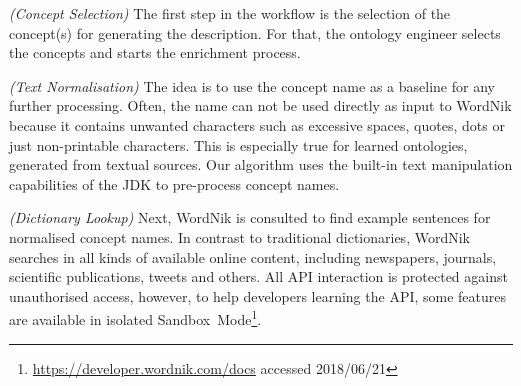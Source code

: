 \begin{enumerate}[label=\textbf{[Step \Roman*]},leftmargin=\widthof{[Step III]}+\labelsep]
	\item \emph{(Concept Selection)} The first step in the workflow is the selection of the concept(s)
	      for generating the description. For that, the ontology engineer selects the concepts and
		  starts the enrichment process. 
	\item \emph{(Text Normalisation)} The idea is to use the concept name as a baseline for any further
	      processing. Often, the name can not be used directly as input to WordNik because it
		  contains unwanted characters such as excessive spaces, quotes, dots or just non-printable
		  characters. This is especially true for learned ontologies, generated from textual sources.
		  Our algorithm uses the built-in text manipulation capabilities of the JDK to pre-process
		  concept names.
	\item \emph{(Dictionary Lookup)} Next, WordNik is consulted to find example sentences for normalised
	      concept names. In contrast to traditional dictionaries, WordNik searches in all kinds of available
		  online content, including newspapers, journals, scientific publications, tweets and others. All
		  API interaction is protected against unauthorised access, however, to help developers learning
		  the API, some features are available in isolated Sandbox~Mode\footnote{\url{https://developer.wordnik.com/docs} accessed  2018/06/21}.
		  

\end{enumerate}

